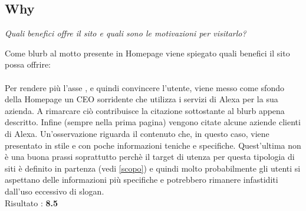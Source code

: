 \subsection{Why}\label{why}
\begin{center}

\textit{Quali benefici offre il sito e quali sono le motivazioni per visitarlo?}

\end{center}
\begin{flushleft}
Come blurb al motto presente in Homepage viene spiegato quali benefici il sito 
possa offrire: \\
\\
Per rendere più  l'asse , e quindi convincere l'utente,
viene messo come sfondo della Homepage un CEO sorridente che utilizza i servizi di Alexa
per la sua azienda. A rimarcare ciò contribuisce la citazione sottostante al 
blurb appena descritto. Infine (sempre nella prima pagina)
vengono citate alcune aziende clienti di Alexa. Un'osservazione riguarda il contenuto
che, in questo caso, viene presentato in stile  e con poche informazioni
teniche e specifiche. Quest'ultima non è una buona prassi soprattutto perchè il target di utenza
per questa tipologia di siti è definito in partenza (vedi \ref{scopo}) e quindi
molto probabilmente gli utenti si aspettano delle informazioni più specifiche 
e potrebbero rimanere infastiditi dall'uso eccessivo di slogan. \\
Risultato : \textbf{8.5}

\end{flushleft}